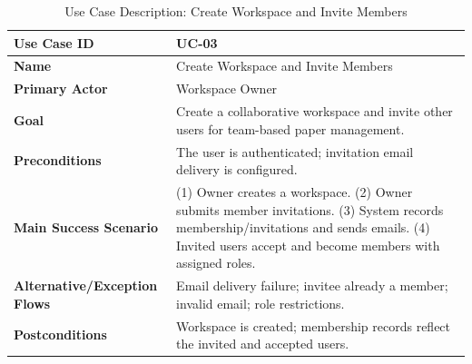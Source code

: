\begin{table}[H]
    \centering
    \small
    \begin{tabularx}{\textwidth}{|l|X|}
        \hline
        \textbf{Use Case ID}                 & UC-03                                                                                                                                                                                             \\
        \hline
        \textbf{Name}                        & Create Workspace and Invite Members                                                                                                                                                               \\
        \hline
        \textbf{Primary Actor}               & Workspace Owner                                                                                                                                                                                   \\
        \hline
        \textbf{Goal}                        & Create a collaborative workspace and invite other users for team-based paper management.                                                                                                          \\
        \hline
        \textbf{Preconditions}               & The user is authenticated; invitation email delivery is configured.                                                                                                                               \\
        \hline
        \textbf{Main Success Scenario}       & (1) Owner creates a workspace. (2) Owner submits member invitations. (3) System records membership/invitations and sends emails. (4) Invited users accept and become members with assigned roles. \\
        \hline
        \textbf{Alternative/Exception Flows} & Email delivery failure; invitee already a member; invalid email; role restrictions.                                                                                                               \\
        \hline
        \textbf{Postconditions}              & Workspace is created; membership records reflect the invited and accepted users.                                                                                                                  \\
        \hline
    \end{tabularx}
    \caption{Use Case Description: Create Workspace and Invite Members}
    \label{tab:uc-03}
\end{table}

